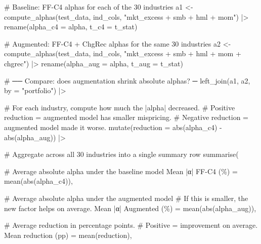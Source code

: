 \documentclass[
  letterpaper,
  DIV=11,
  numbers=noendperiod]{scrartcl}
\newenvironment{Shaded}{\begin{snugshade}}{\end{snugshade}}
\newcommand{\AttributeTok}[1]{\textcolor[rgb]{0.40,0.45,0.13}{#1}}
\newcommand{\CommentTok}[1]{\textcolor[rgb]{0.37,0.37,0.37}{#1}}
\newcommand{\FunctionTok}[1]{\textcolor[rgb]{0.28,0.35,0.67}{#1}}
\newcommand{\NormalTok}[1]{\textcolor[rgb]{0.00,0.23,0.31}{#1}}
\newcommand{\OtherTok}[1]{\textcolor[rgb]{0.00,0.23,0.31}{#1}}
\newcommand{\SpecialCharTok}[1]{\textcolor[rgb]{0.37,0.37,0.37}{#1}}
\newcommand{\StringTok}[1]{\textcolor[rgb]{0.13,0.47,0.30}{#1}}
\begin{document}
\begin{Shaded}
\begin{Highlighting}[]
\CommentTok{\# Baseline: FF{-}C4 alphas for each of the 30 industries}
\NormalTok{a1 }\OtherTok{\textless{}{-}} \FunctionTok{compute\_alphas}\NormalTok{(test\_data, ind\_cols, }\StringTok{"mkt\_excess + smb + hml + mom"}\NormalTok{) }\SpecialCharTok{|\textgreater{}}
  \FunctionTok{rename}\NormalTok{(}\AttributeTok{alpha\_c4 =}\NormalTok{ alpha, }\AttributeTok{t\_c4 =}\NormalTok{ t\_stat)}

\CommentTok{\# Augmented: FF{-}C4 + ChgRec alphas for the same 30 industries}
\NormalTok{a2 }\OtherTok{\textless{}{-}} \FunctionTok{compute\_alphas}\NormalTok{(test\_data, ind\_cols, }\StringTok{"mkt\_excess + smb + hml + mom + chgrec"}\NormalTok{) }\SpecialCharTok{|\textgreater{}}
  \FunctionTok{rename}\NormalTok{(}\AttributeTok{alpha\_aug =}\NormalTok{ alpha, }\AttributeTok{t\_aug =}\NormalTok{ t\_stat)}

\CommentTok{\# ── Compare: does augmentation shrink absolute alphas? ─}
\FunctionTok{left\_join}\NormalTok{(a1, a2, }\AttributeTok{by =} \StringTok{"portfolio"}\NormalTok{) }\SpecialCharTok{|\textgreater{}}
  
  \CommentTok{\# For each industry, compute how much the |alpha| decreased.}
  \CommentTok{\# Positive reduction = augmented model has smaller mispricing.}
  \CommentTok{\# Negative reduction = augmented model made it worse.}
  \FunctionTok{mutate}\NormalTok{(}\AttributeTok{reduction =} \FunctionTok{abs}\NormalTok{(alpha\_c4) }\SpecialCharTok{{-}} \FunctionTok{abs}\NormalTok{(alpha\_aug)) }\SpecialCharTok{|\textgreater{}}
  
  \CommentTok{\# Aggregate across all 30 industries into a single summary row}
  \FunctionTok{summarise}\NormalTok{(}
    
    \CommentTok{\# Average absolute alpha under the baseline model}
    \StringTok{\textasciigrave{}}\AttributeTok{Mean |α| FF{-}C4 (\%)}\StringTok{\textasciigrave{}} \OtherTok{=} \FunctionTok{mean}\NormalTok{(}\FunctionTok{abs}\NormalTok{(alpha\_c4)),}
    
    \CommentTok{\# Average absolute alpha under the augmented model}
    \CommentTok{\# If this is smaller, the new factor helps on average.}
    \StringTok{\textasciigrave{}}\AttributeTok{Mean |α| Augmented (\%)}\StringTok{\textasciigrave{}} \OtherTok{=} \FunctionTok{mean}\NormalTok{(}\FunctionTok{abs}\NormalTok{(alpha\_aug)),}
    
    \CommentTok{\# Average reduction in percentage points.}
    \CommentTok{\# Positive = improvement on average.}
    \StringTok{\textasciigrave{}}\AttributeTok{Mean reduction (pp)}\StringTok{\textasciigrave{}} \OtherTok{=} \FunctionTok{mean}\NormalTok{(reduction),}
    

\end{Highlighting}
\end{Shaded}
\end{document}

